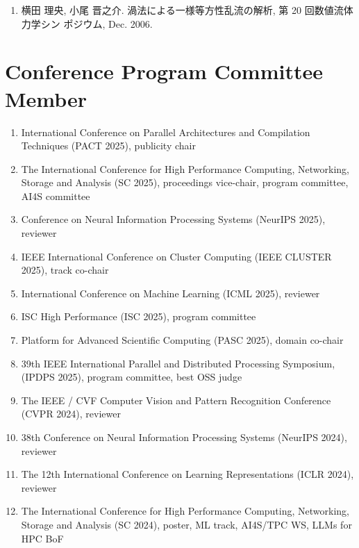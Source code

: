 \documentclass[margin,line]{cv}
\begin{document}
\begin{resume}
\begin{enumerate}
\item 横田 理央, 小尾 晋之介. 渦法による一様等方性乱流の解析, 第 20 回数値流体力学シン ポジウム, Dec. 2006.
\end{enumerate}

\section{\sc Conference Program Committee Member}
\begin{enumerate}
\item International Conference on Parallel Architectures and Compilation Techniques (PACT 2025), publicity chair 

\item The International Conference for High Performance Computing, Networking, Storage and Analysis (SC 2025), proceedings vice-chair, program committee, AI4S committee

\item Conference on Neural Information Processing Systems (NeurIPS 2025), reviewer

\item IEEE International Conference on Cluster Computing (IEEE CLUSTER 2025), track co-chair

\item International Conference on Machine Learning (ICML 2025), reviewer

\item ISC High Performance (ISC 2025), program committee

\item Platform for Advanced Scientific Computing (PASC 2025), domain co-chair

\item 39th IEEE International Parallel and Distributed Processing Symposium, (IPDPS 2025), program committee, best OSS judge

\item The IEEE / CVF Computer Vision and Pattern Recognition Conference (CVPR 2024), reviewer

\item 38th Conference on Neural Information Processing Systems (NeurIPS 2024), reviewer

\item The 12th International Conference on Learning Representations (ICLR 2024), reviewer

\item The International Conference for High Performance Computing, Networking, Storage and Analysis (SC 2024), poster, ML track, AI4S/TPC WS, LLMs for HPC BoF


\end{enumerate}
\end{resume}
\end{document}
